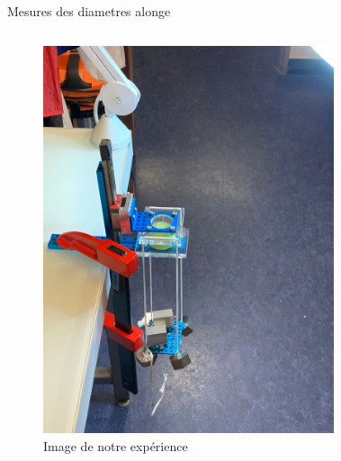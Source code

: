 \documentclass[aspectratio=169,xcolor=dvipsnames]{beamer}
\begin{document}
\begin{frame}{Mesures des diametres alonge}
\begin{columns}
\begin{figure}
            \includegraphics[height=0.65\textheight]{IMG-20221205-WA0027.jpg}
            \caption{Image de notre expérience}
            \label{fig:my_label}
        \end{figure}
        \begin{figure}
            \centering

\end{figure}
\end{columns}
\end{frame}
\end{document}
